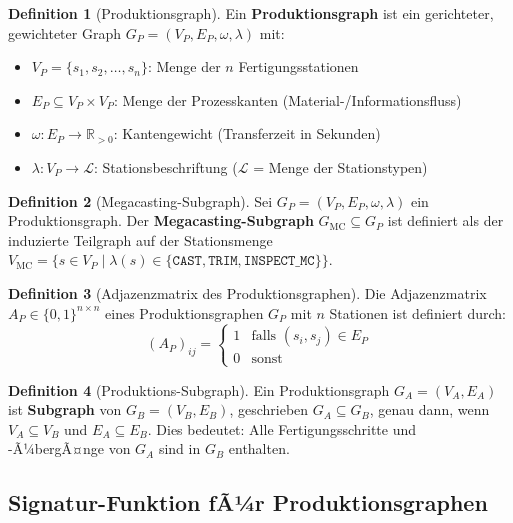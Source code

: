 ﻿\documentclass[a4paper,12pt]{article}
\theoremstyle{definition}
\newtheorem{definition}{Definition}
\begin{document}
\begin{definition}[Produktionsgraph]
\label{def:produktionsgraph}
Ein \textbf{Produktionsgraph} ist ein gerichteter, gewichteter Graph
$G_P = (V_P, E_P, \omega, \lambda)$ mit:
\begin{itemize}
\item $V_P = \{s_1, s_2, \ldots, s_n\}$: Menge der $n$ Fertigungsstationen
\item $E_P \subseteq V_P \times V_P$: Menge der Prozesskanten (Material-/Informationsfluss)
\item $\omega: E_P \to \mathbb{R}_{>0}$: Kantengewicht (Transferzeit in Sekunden)
\item $\lambda: V_P \to \mathcal{L}$: Stationsbeschriftung ($\mathcal{L}$ = Menge der Stationstypen)
\end{itemize}
\end{definition}

\begin{definition}[Megacasting-Subgraph]
\label{def:megacasting}
Sei $G_P = (V_P, E_P, \omega, \lambda)$ ein Produktionsgraph. Der
\textbf{Megacasting-Subgraph} $G_{\mathrm{MC}} \subseteq G_P$ ist definiert als
der induzierte Teilgraph auf der Stationsmenge
$V_{\mathrm{MC}} = \{s \in V_P \mid \lambda(s) \in \{\texttt{CAST}, \texttt{TRIM}, \texttt{INSPECT\_MC}\}\}$.
\end{definition}

\begin{definition}[Adjazenzmatrix des Produktionsgraphen]
\label{def:adjazenz}
Die Adjazenzmatrix $A_P \in \{0,1\}^{n \times n}$ eines Produktionsgraphen $G_P$
mit $n$ Stationen ist definiert durch:
\[
(A_P)_{ij} = \begin{cases}
  1 & \text{falls } (s_i, s_j) \in E_P \\
  0 & \text{sonst}
\end{cases}
\]
\end{definition}

\begin{definition}[Produktions-Subgraph]
\label{def:subgraph}
Ein Produktionsgraph $G_A = (V_A, E_A)$ ist \textbf{Subgraph} von
$G_B = (V_B, E_B)$, geschrieben $G_A \subseteq G_B$, genau dann, wenn
$V_A \subseteq V_B$ und $E_A \subseteq E_B$. Dies bedeutet: Alle Fertigungsschritte
und -Ã¼bergÃ¤nge von $G_A$ sind in $G_B$ enthalten.
\end{definition}

\subsection{Signatur-Funktion fÃ¼r Produktionsgraphen}
\end{document}
